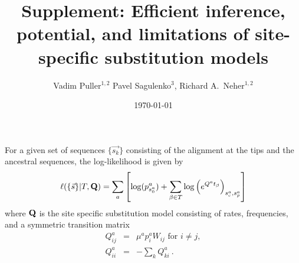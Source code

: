 \documentclass[aps,rmp,onecolumn]{revtex4}
\newcommand{\mat}[1]{{\bf #1}}
\newcommand{\eqp}{p}
\newcommand{\lh}{\ell}
\begin{document}
\renewcommand{\thefigure}{S\arabic{figure}}
\renewcommand{\thetable}{S\arabic{table}}
\setcounter{figure}{0}
\setcounter{table}{0}

\title{Supplement: Efficient inference, potential, and limitations of site-specific substitution models}
\author{Vadim Puller$^{1,2}$ Pavel Sagulenko$^{3}$, Richard A.~Neher$^{1,2}$}

\date{\today}
\maketitle

For a given set of sequences $\{\vec{s_k}\}$ consisting of the alignment at the tips and the ancestral sequences, the log-likelihood is given by
\begin{equation}
	\label{eq:logLH}
	\lh(\{\vec{s}\} |T, \mat{Q}) = \sum_a \left[\log(\eqp^a_{s^{a}_0}) + \sum_{\beta\in T} \log\left( e^{Q^at_\beta} \right)_{s^a_c, s^a_p}\right]
\end{equation}
where $\mat{Q}$ is the site specific substitution model consisting of rates, frequencies, and a symmetric transition matrix
\begin{eqnarray}
Q^{a}_{ij} &=& \mu^{a}\eqp^{a}_{i} W_{ij} \textrm{ for } i\neq j,\nonumber \\
Q^{a}_{ii} &=& -\sum_k Q^{a}_{ki} \ .
\label{eq:Qij_supp}
\end{eqnarray}
\end{document}
